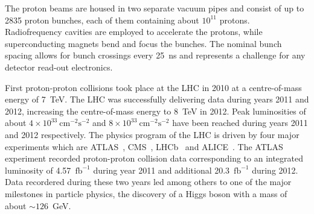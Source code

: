 The proton beams are  housed in two separate vacuum pipes and consist of up to 2835 proton bunches, each
of them containing about $10^{11}$ protons. 
Radiofrequency cavities are employed  to accelerate the protons,
while superconducting magnets bend and focus the bunches.
The nominal bunch spacing allows for bunch crossings  every 25~ns and represents a challenge for any detector read-out electronics.

First proton-proton collisions took place at the LHC in 2010 at a centre-of-mass  energy of 7~TeV. 
The LHC was successfully delivering data during  years 2011 and 2012, increasing the  centre-of-mass  energy to 8~TeV in 2012.
Peak luminosities of about $4\times10^{33} ~ \text{cm}^{-2}\text{s}^{-2}$ and $8\times10^{33} ~ \text{cm}^{-2}\text{s}^{-2}$  have been reached 
during years 2011 and 2012 respectively.
The physics program of the LHC is driven by four major experiments which are ATLAS~\cite{ATLASDetector}, CMS~\cite{cms},
LHCb~\cite{lhcb} and ALICE~\cite{alice}. 
The ATLAS experiment recorded proton-proton collision data corresponding to an integrated luminosity of 4.57~$\text{fb}^{-1}$ 
during year 2011 and additional  20.3~$\text{fb}^{-1}$ during 2012.
Data recordered during  these two years  led among others to one of the major milestones
 in particle physics, the discovery of  a Higgs boson with a mass of about $\sim 126$~GeV.





